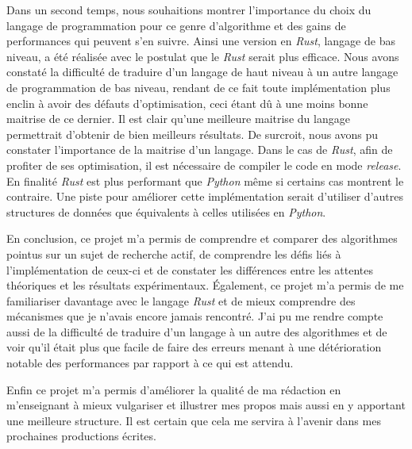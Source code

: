 \documentclass[12pt,a4paper]{article}
\begin{document}
Dans un second temps, nous souhaitions montrer l'importance du choix du langage de programmation pour ce genre d'algorithme et des gains de performances qui peuvent s'en suivre. Ainsi une version en \emph{Rust}, langage de bas niveau, a été réalisée avec le postulat que le \emph{Rust} serait plus efficace. Nous avons constaté la difficulté de traduire d'un langage de haut niveau à un autre langage de programmation de bas niveau, rendant de ce fait toute implémentation plus enclin à avoir des défauts d'optimisation, ceci étant dû à une moins bonne maitrise de ce dernier. Il est clair qu'une meilleure maitrise du langage permettrait d'obtenir de bien meilleurs résultats. De surcroit, nous avons pu constater l'importance de la maitrise d'un langage. Dans le cas de \emph{Rust}, afin de profiter de ses optimisation, il est nécessaire de compiler le code en mode \emph{release}. En finalité \emph{Rust} est plus performant que \emph{Python} même si certains cas montrent le contraire. Une piste pour améliorer cette implémentation serait d'utiliser d'autres structures de données que équivalents à celles utilisées en \emph{Python}.

En conclusion, ce projet m'a permis de comprendre et comparer des algorithmes pointus sur un sujet de recherche actif, de comprendre les défis liés à l'implémentation de ceux-ci et de constater les différences entre les attentes théoriques et les résultats expérimentaux. Également, ce projet m'a permis de me familiariser davantage avec le langage \emph{Rust} et de mieux comprendre des mécanismes que je n'avais encore jamais rencontré. J'ai pu me rendre compte aussi de la difficulté de traduire d'un langage à un autre des algorithmes et de voir qu'il était plus que facile de faire des erreurs menant à une détérioration notable des performances par rapport à ce qui est attendu.

Enfin ce projet m'a permis d'améliorer la qualité de ma rédaction en m'enseignant à mieux vulgariser et illustrer mes propos mais aussi en y apportant une meilleure structure. Il est certain que cela me servira à l'avenir dans mes prochaines productions écrites.


\newpage


\end{document}
